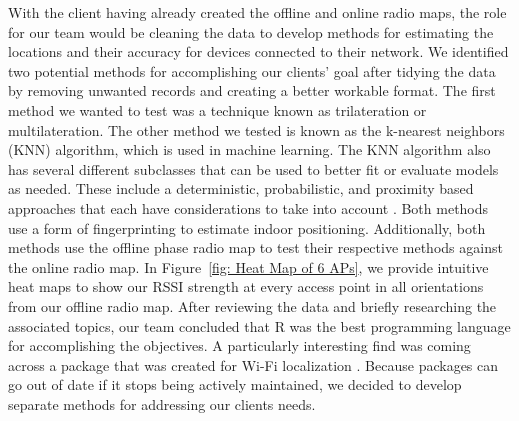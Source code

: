 \documentclass[12pt, conference]{IEEEtran}
\begin{document}
With the client having already created the offline and online radio maps, the role for our team would be cleaning the data to develop methods for estimating the locations and their accuracy for devices connected to their network. We identified two potential methods for accomplishing our clients' goal after tidying the data by removing unwanted records and creating a better workable format. The first method we wanted to test was a technique known as trilateration or multilateration. The other method we tested is known as the k-nearest neighbors (KNN) algorithm, which is used in machine learning. The KNN algorithm also has several different subclasses that can be used to better fit or evaluate models as needed. These include a deterministic, probabilistic, and proximity based approaches that each have considerations to take into account \cite{b4, b5}. Both methods use a form of fingerprinting to estimate indoor positioning. Additionally, both methods use the offline phase radio map to test their respective methods against the online radio map. In Figure~\ref{fig: Heat Map of 6 APs}, we provide intuitive heat maps to show our RSSI strength at every access point in all orientations from our offline radio map. After reviewing the data and briefly researching the associated topics, our team concluded that R was the best programming language for accomplishing the objectives. A particularly interesting find was coming across a package that was created for Wi-Fi localization \cite{b4}. Because packages can go out of date if it stops being actively maintained, we decided to develop separate methods for addressing our clients needs. 
\end{document}
